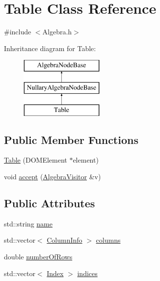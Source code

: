 \hypertarget{class_table}{\section{Table Class Reference}
\label{class_table}
}


{\ttfamily \#include $<$Algebra.\+h$>$}

Inheritance diagram for Table\+:\begin{figure}[H]
\begin{center}
\leavevmode
\includegraphics[height=3.000000cm]{class_table}
\end{center}
\end{figure}
\subsection*{Public Member Functions}
\begin{DoxyCompactItemize}
\item 
\hyperlink{class_table_ab2c4d8adebfd7136e19d843c8bcf44c3}{Table} (D\+O\+M\+Element $\ast$element)
\item 
void \hyperlink{class_table_a4496e1f66e8faa9b4fcf5c115a9b16f3}{accept} (\hyperlink{class_algebra_visitor}{Algebra\+Visitor} \&v)
\end{DoxyCompactItemize}
\subsection*{Public Attributes}
\begin{DoxyCompactItemize}
\item 
std\+::string \hyperlink{class_table_a776e2cab59507b3b59d475a964e347b8}{name}
\item 
std\+::vector$<$ \hyperlink{class_column_info}{Column\+Info} $>$ \hyperlink{class_table_ad6e2d1b269aa5c182e0357b75f46eee0}{columns}
\item 
double \hyperlink{class_table_ae85736953b357d0d44a50fd4a47de796}{number\+Of\+Rows}
\item 
std\+::vector$<$ \hyperlink{class_index}{Index} $>$ \hyperlink{class_table_a985077d6ec6eacb7828b78b9b9bc6157}{indices}
\end{DoxyCompactItemize}


